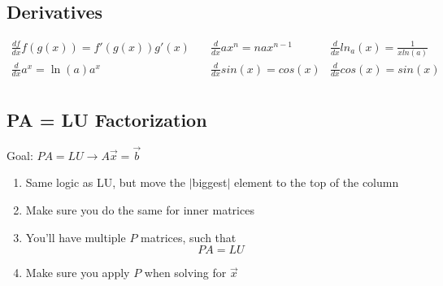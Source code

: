 \documentclass[10pt]{article}
\begin{document}
\begin{multicols}{2}
\begin{minipage}{\columnwidth}
        \subsection*{Derivatives}
        \small
        \begin{equation*}
            \begin{aligned}
                \frac{df}{dx} f(g(x)) = f'(g(x))g'(x) & \quad \frac{d}{dx} ax^n = nax^{n-1} & \frac{d}{dx} ln_a(x) = \frac{1}{xln(a)} \\
                \frac{d}{dx} a^x = \ln(a) a^x         & \quad \frac{d}{dx} sin(x) = cos(x)  & \frac{d}{dx} cos(x) = sin(x)            \\
            \end{aligned}
        \end{equation*}
    \end{minipage}

    \begin{minipage}{0.95\columnwidth}
        \subsection*{PA = LU Factorization}
        Goal: \(PA = LU \rightarrow A\overrightarrow{x} = \overrightarrow{b}\) \\
        \begin{enumerate}
            \item Same logic as LU, but move the \(|\)biggest\(|\) element to the top of the column
            \item Make sure you do the same for inner matrices
            \item You'll have multiple \(P\) matrices, such that
                  \begin{equation*}
                      PA = LU
                  \end{equation*}
            \item Make sure you apply \(P\) when solving for \(\overrightarrow{x}\)
        \end{enumerate}


\end{minipage}
\end{multicols}
\end{document}
